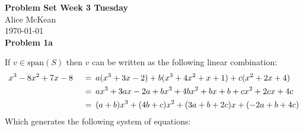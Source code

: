 \documentclass{article}
\newcommand{\problem}[1]{\large\textbf{Problem #1}\normalsize}
\newcommand{\relation}[1]{\ensuremath{\hspace{0.2em} {{} #1 {}} \hspace{0.2em}}}
\newcommand{\equal}{\relation{=}}
\begin{document}
\noindent\Large\textbf{Problem Set Week 3 Tuesday} \\
\normalsize
Alice McKean \\
\today \\

\problem{1a}

If $v \in \text{span}(S)$ then $v$ can be written as the following linear combination: 
\begin{alignat*}{3}
  & x^3 - 8x^2 + 7x - 8 & \equal & a(x^3 + 3x - 2) + b(x^3 + 4x^2 + x + 1) + c(x^2 + 2x + 4) \\
  & {}                  & \equal & ax^3 + 3ax - 2a + bx^3 + 4bx^2 + bx + b + cx^2 + 2cx + 4c \\
  & {}                  & \equal & (a + b)x^3 + (4b + c)x^2 + (3a + b + 2c)x + (-2a + b + 4c)
\end{alignat*}
Which generates the following system of equations:
\end{document}
